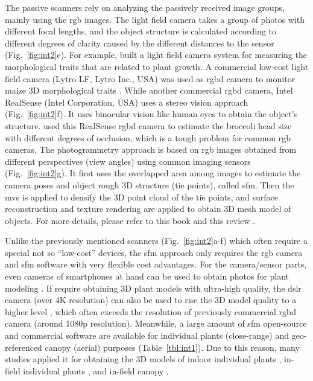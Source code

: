 The passive scanners rely on analyzing the passively received image groups, mainly using the \gls{rgb} images. The light field camera takes a group of photos with different focal lengths, and the object structure is calculated according to different degrees of clarity caused by the different distances to the sensor (Fig.~\ref{fig:int2}e). For example, \citet{apelt_phytotyping_2015} built a light field camera system for measuring the morphological traits that are related to plant growth. A commercial low-cost light field camera (Lytro LF, Lytro Inc., USA) was used as \gls{rgbd} camera to monitor maize 3D morphological traits \citep{schima_imagine_2016}. While another commercial \gls{rgbd} camera, Intel RealSense (Intel Corporation, USA) uses a stereo vision approach (Fig.~\ref{fig:int2}f). It uses binocular vision like human eyes to obtain the object's structure. \citet{blok_image_2021} used this RealSense \gls{rgbd} camera to estimate the broccoli head size with different degrees of occlusion, which is a tough problem for common \gls{rgb} cameras. The photogrammetry approach is based on \gls{rgb} images obtained from different perspectives (view angles) using common imaging sensors (Fig.~\ref{fig:int2}g). It first uses the overlapped area among images to estimate the camera poses and object rough 3D structure (tie points), called \acrfull{sfm}. Then the \gls{mvs} is applied to densify the 3D point cloud of the tie points, and surface reconstruction and texture rendering are applied to obtain 3D mesh model of objects. For more details, please refer to this book \citep{hartley_multiple_2000} and this review \citep{snavely_scene_2010}. 

Unlike the previously mentioned scanners (Fig.~\ref{fig:int2}a-f) which often require a special not so ``low-cost'' devices, the \gls{sfm} approach only requires the \gls{rgb} camera and \gls{sfm} software with very flexible cost advantages. For the camera/sensor parts, even cameras of smartphones at hand can be used to obtain photos for plant modeling \citep{li_measuring_2020}. If require obtaining 3D plant models with ultra-high quality, the \gls{dslr} camera (over 4K resolution) can also be used to rise the 3D model quality to a higher level \citep{nguyen_3d_2016, drofova_use_2023}, which often exceeds the resolution of previously commercial \gls{rgbd} camera (around 1080p resolution). Meanwhile, a large amount of \gls{sfm} open-source and commercial software are available for individual plants (close-range) and geo-referenced canopy (aerial) purposes (Table~\ref{tbl:int1}). Due to this reason, many studies applied it for obtaining the 3D models of indoor individual plants \citep{wu_mvs-pheno_2020, zhou_automated_2019}, in-field individual plants \citep{jay_field_2015, herrero_structural_2023}, and in-field canopy \citep{kim_modeling_2018, herrero_canopy_2020}.

